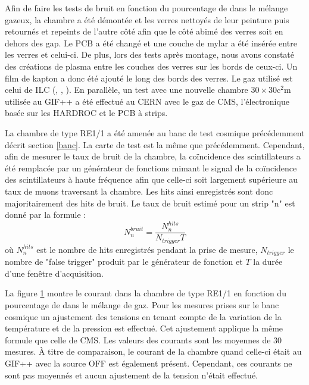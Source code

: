  Afin de faire les tests de bruit en fonction du pourcentage de  dans le mélange gazeux, la chambre a été démontée et les verres nettoyés de leur peinture puis retournés et repeints de l'autre côté afin que le côté abimé des verres soit en dehors des gap. Le PCB a été changé et une couche de mylar a été insérée entre les verres et celui-ci. De plus, lors des tests après montage, nous avons constaté des créations de plasma entre les couches des verres sur les bords de ceux-ci. Un film de kapton a donc été ajouté le long des bords des verres. Le gaz utilisé est celui de ILC (, , ). En parallèle, un test avec une nouvelle chambre $\num{30}\times\num{30}\si{\square\centi\meter}$ utilisée au GIF++ a été effectué au CERN avec le gaz de CMS, l'électronique basée sur les HARDROC et le PCB à strips.
 
 La chambre de type RE1/1 a été amenée au banc de test cosmique précédemment décrit section \ref{banc}. La carte de test est la même que précédemment. Cependant, afin de mesurer le taux de bruit de la chambre, la coïncidence des scintillateurs a été remplacée par un générateur de fonctions mimant le signal de la coïncidence des scintillateurs à haute fréquence afin que celle-ci soit largement supérieure au taux de muons traversant la chambre. Les hits ainsi enregistrés sont donc majoritairement des hits de bruit. Le taux de bruit estimé pour un strip "n" est donné par la formule :
 \begin{equation}
 N_n^{bruit}=\frac{N_n^{hits}}{N_{trigger}T}
 \end{equation}
 où $N_n^{hits}$ est le nombre de hits enregistrés pendant la prise de mesure, $N_{trigger}$ le nombre de "false trigger" produit par le générateur de fonction et $T$ la durée d'une fenêtre d'acquisition.
 
 La figure \ref{CurrentDOME} montre le courant dans la chambre de type RE1/1 en fonction du pourcentage de  dans le mélange de gaz. Pour les mesures prises sur le banc cosmique un ajustement des tensions en tenant compte de la variation de la température et de la pression est effectué. Cet ajustement applique la même formule que celle de CMS. Les valeurs des courants sont les moyennes de 30 mesures. À titre de comparaison, le courant de la chambre quand celle-ci était au GIF++ avec la source OFF est également présent. Cependant, ces courants ne sont pas moyennés et aucun ajustement de la tension n'était effectué.
 
\begin{figure}[ht!]
	\centering
	\scalebox{1.2}{}
	\label{CurrentDOME}
\end{figure}
 
